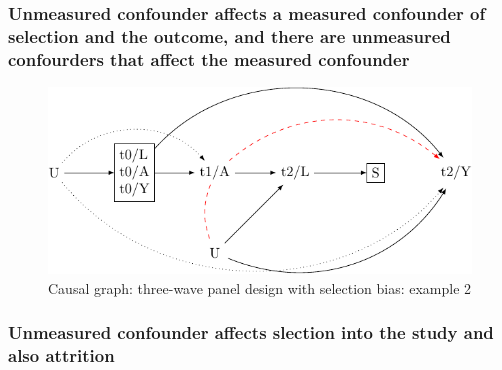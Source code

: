 \documentclass[
  singlecolumn]{report}
\begin{document}
\hypertarget{unmeasured-confounder-affects-a-measured-confounder-of-selection-and-the-outcome-and-there-are-unmeasured-confourders-that-affect-the-measured-confounder}{%
\subsubsection{Unmeasured confounder affects a measured confounder of
selection and the outcome, and there are unmeasured confourders that
affect the measured
confounder}\label{unmeasured-confounder-affects-a-measured-confounder-of-selection-and-the-outcome-and-there-are-unmeasured-confourders-that-affect-the-measured-confounder}}

\begin{figure}

{\centering \includegraphics[width=1\textwidth,height=\textheight]{causal-dags_files/figure-pdf/fig-dag-8-2-1.pdf}

}

\caption{\label{fig-dag-8-2}Causal graph: three-wave panel design with
selection bias: example 2}

\end{figure}

\hypertarget{unmeasured-confounder-affects-slection-into-the-study-and-also-attrition}{%
\subsubsection{Unmeasured confounder affects slection into the study and
also
attrition}\label{unmeasured-confounder-affects-slection-into-the-study-and-also-attrition}}
\end{document}
